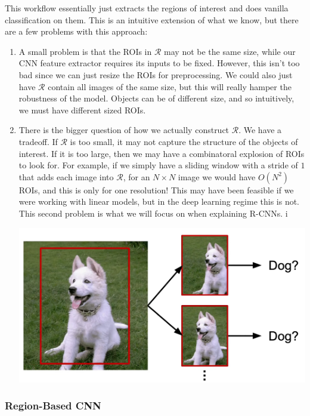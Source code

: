 \documentclass{article}
\theoremstyle{definition}
\theoremstyle{remark}
\theoremstyle{definition}
\begin{document}
This workflow essentially just extracts the regions of interest and does vanilla classification on them. This is an intuitive extension of what we know, but there are a few problems with this approach: 
\begin{enumerate}
    \item A small problem is that the ROIs in $\mathcal{R}$ may not be the same size, while our CNN feature extractor requires its inputs to be fixed. However, this isn't too bad since we can just resize the ROIs for preprocessing. We could also just have $\mathcal{R}$ contain all images of the same size, but this will really hamper the robustness of the model. Objects can be of different size, and so intuitively, we must have different sized ROIs. 
    \item There is the bigger question of how we actually construct $\mathcal{R}$. We have a tradeoff. If $\mathcal{R}$ is too small, it may not capture the structure of the objects of interest. If it is too large, then we may have a combinatoral explosion of ROIs to look for. For example, if we simply have a sliding window with a stride of $1$ that adds each image into $\mathcal{R}$, for an $N \times N$ image we would have $O(N^2)$ ROIs, and this is only for one resolution! This may have been feasible if we were working with linear models, but in the deep learning regime this is not. This second problem is what we will focus on when explaining R-CNNs. i
    \begin{center}
        \includegraphics[scale=0.3]{Images/sliding_window.png}
    \end{center}
\end{enumerate}

\subsubsection{Region-Based CNN}
\end{document}
